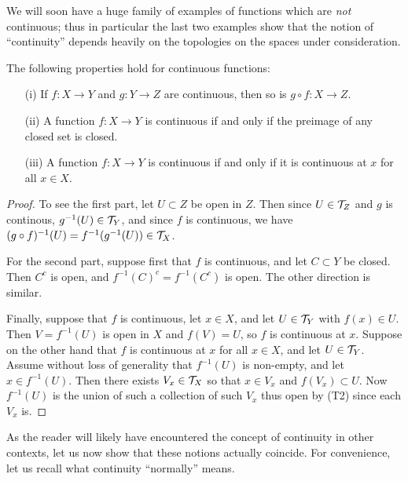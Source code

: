 We will soon have a huge family of examples of functions which are \emph{not} continuous; thus in particular the last two examples show that the notion of ``continuity'' depends heavily on the topologies on the spaces under consideration.
\begin{thm}
  \label{continuous-props}
  The following properties hold for continuous functions:
  \begin{enumerate}
    \item[(i)] If $f: X \to Y$ and $g : Y \to Z$ are continuous, then so is $g \circ f : X \to Z$.
    \item[(ii)] A function $f : X \to Y$ is continuous if and only if the preimage of any closed set is closed.
    \item[(iii)] A function $f : X \to Y$ is continuous if and only if it is continuous at $x$ for all $x \in X$.
  \end{enumerate}
\end{thm}
\begin{proof}
  To see the first part, let $U \subset Z$ be open in $Z$. Then since $U \in \mathcal{T}_Z$ and $g$ is continous, $g^{-1}(U) \in \mathcal{T}_Y$, and since $f$ is continuous, we have $(g \circ f)^{-1}(U) = f^{-1}(g^{-1}(U)) \in \mathcal{T}_X$.
  
  For the second part, suppose first that $f$ is continuous, and let $C \subset Y$ be closed. Then $C^c$ is open, and $f^{-1}(C)^c = f^{-1}(C^c)$ is open. The other direction is similar.
  
  Finally, suppose that $f$ is continuous, let $x \in X$, and let $U \in \mathcal{T}_Y$ with $f(x) \in U$. Then $V = f^{-1}(U)$ is open in $X$ and $f(V) = U$, so $f$ is continuous at $x$. Suppose on the other hand that $f$ is continuous at $x$ for all $x \in X$, and let $U \in \mathcal{T}_Y$. Assume without loss of generality that $f^{-1}(U)$ is non-empty, and let $x \in f^{-1}(U)$. Then there exists $V_x \in \mathcal{T}_X$ so that $x \in V_x$ and $f(V_x) \subset U$. Now $f^{-1}(U)$ is the union of such a collection of such $V_x$ thus open by (T2) since each $V_x$ is.
\end{proof}

As the reader will likely have encountered the concept of continuity in other contexts, let us now show that these notions actually coincide. For convenience, let us recall what continuity ``normally'' means.

